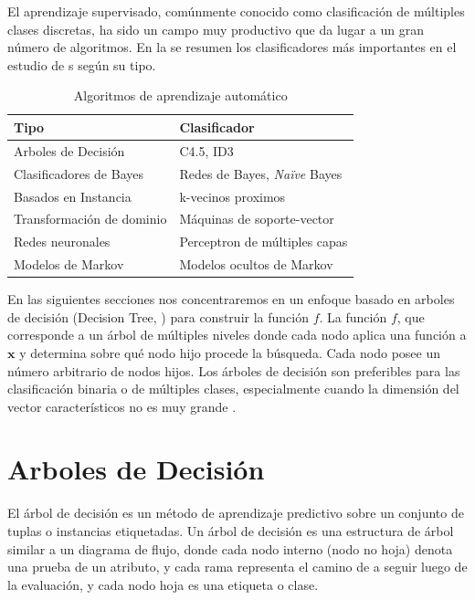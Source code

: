 El aprendizaje supervisado, comúnmente conocido como clasificación de múltiples clases discretas, ha sido un campo muy productivo que da lugar a un gran número de algoritmos. En la  se resumen los clasificadores más importantes en el estudio de s según su tipo.
\begin{table}[!htbp]
\begin{centering}
\begin{tabular}{|l|l|}
\hline 
		Tipo 						& Clasificador							\\
\hline 
\hline 
		Arboles de Decisión 		& C4.5, ID3								\\
\hline 
		Clasificadores de Bayes 	& Redes de Bayes, \emph{Naïve} Bayes	\\
\hline 
		Basados en Instancia 		& k-vecinos proximos					\\
\hline 
		Transformación de dominio 	& Máquinas de soporte-vector			\\
\hline 
		Redes neuronales 			& Perceptron de múltiples capas			\\
\hline 
		Modelos de Markov 			& Modelos ocultos de Markov				\\
\hline
\end{tabular}
\par\end{centering}
\caption[Algoritmos de ]{\label{tab3:clasificadores} Algoritmos de aprendizaje automático}
\end{table}

En las siguientes secciones nos concentraremos en un enfoque basado en arboles de decisión (Decision Tree, ) para construir la función $f$. La función $f$, que corresponde a un árbol de múltiples niveles donde cada nodo aplica una función a $\boldsymbol{x}$ y determina sobre qué nodo hijo procede la búsqueda. Cada nodo posee un número arbitrario de nodos hijos. Los árboles de decisión son preferibles para las clasificación binaria o de múltiples clases, especialmente cuando la dimensión del vector característicos no es muy grande \cite{Rajaraman2011}.

\section{Arboles de Decisión}
El árbol de decisión es un método de aprendizaje predictivo sobre un conjunto de tuplas o instancias etiquetadas. Un árbol de decisión es una estructura de árbol similar a un diagrama de flujo, donde cada nodo interno (nodo no hoja) denota una prueba de un atributo, y cada rama representa el camino de a seguir luego de la evaluación, y cada nodo hoja es una etiqueta o clase.

